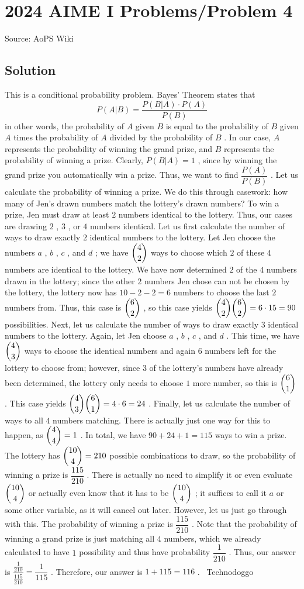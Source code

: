 \documentclass[12pt]{article}
\begin{document}
\section*{{2024 AIME I Problems/Problem 4}}
Source: AoPS Wiki

\subsection*{Solution}
This is a conditional probability problem. Bayes' Theorem states that \[P(A|B)=\dfrac{P(B|A)\cdot P(A)}{P(B)}\] in other words, the probability of $A$ given $B$ is equal to the probability of $B$ given $A$ times the probability of $A$ divided by the probability of $B$ . In our case, $A$ represents the probability of winning the grand prize, and $B$ represents the probability of winning a prize. Clearly, $P(B|A)=1$ , since by winning the grand prize you automatically win a prize. Thus, we want to find $\dfrac{P(A)}{P(B)}$ . Let us calculate the probability of winning a prize. We do this through casework: how many of Jen's drawn numbers match the lottery's drawn numbers? To win a prize, Jen must draw at least $2$ numbers identical to the lottery. Thus, our cases are drawing $2$ , $3$ , or $4$ numbers identical. Let us first calculate the number of ways to draw exactly $2$ identical numbers to the lottery. Let Jen choose the numbers $a$ , $b$ , $c$ , and $d$ ; we have $\dbinom42$ ways to choose which $2$ of these $4$ numbers are identical to the lottery. We have now determined $2$ of the $4$ numbers drawn in the lottery; since the other $2$ numbers Jen chose can not be chosen by the lottery, the lottery now has $10-2-2=6$ numbers to choose the last $2$ numbers from. Thus, this case is $\dbinom62$ , so this case yields $\dbinom42\dbinom62=6\cdot15=90$ possibilities. Next, let us calculate the number of ways to draw exactly $3$ identical numbers to the lottery. Again, let Jen choose $a$ , $b$ , $c$ , and $d$ . This time, we have $\dbinom43$ ways to choose the identical numbers and again $6$ numbers left for the lottery to choose from; however, since $3$ of the lottery's numbers have already been determined, the lottery only needs to choose $1$ more number, so this is $\dbinom61$ . This case yields $\dbinom43\dbinom61=4\cdot6=24$ . Finally, let us calculate the number of ways to all $4$ numbers matching. There is actually just one way for this to happen, as $\dbinom44=1$ . In total, we have $90+24+1=115$ ways to win a prize. The lottery has $\dbinom{10}4=210$ possible combinations to draw, so the probability of winning a prize is $\dfrac{115}{210}$ . There is actually no need to simplify it or even evaluate $\dbinom{10}4$ or actually even know that it has to be $\dbinom{10}4$ ; it suffices to call it $a$ or some other variable, as it will cancel out later. However, let us just go through with this. The probability of winning a prize is $\dfrac{115}{210}$ . Note that the probability of winning a grand prize is just matching all $4$ numbers, which we already calculated to have $1$ possibility and thus have probability $\dfrac1{210}$ . Thus, our answer is $\dfrac{\frac1{210}}{\frac{115}{210}}=\dfrac1{115}$ . Therefore, our answer is $1+115=\boxed{116}$ . ~Technodoggo
\end{document}
